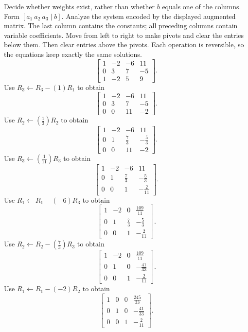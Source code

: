 \goal Decide whether weights exist, rather than whether $b$ equals one of the columns. Form $[a_1\ a_2\ a_3\mid b]$.
\goal Analyze the system encoded by the displayed augmented matrix. The last column contains the constants; all preceding columns contain variable coefficients.
\idea Move from left to right to make pivots and clear the entries below them. Then clear entries above the pivots. Each operation is reversible, so the equations keep exactly the same solutions.
\[ \left[\begin{array}{rrr|r}1&-2&-6&11\\0&3&7&-5\\1&-2&5&9\end{array}\right].\]
Use $R_{3}\leftarrow R_{3}-(1)R_{1}$ to obtain
\[ \left[\begin{array}{rrr|r}1&-2&-6&11\\0&3&7&-5\\0&0&11&-2\end{array}\right].\]
Use $R_{2}\leftarrow(\frac{1}{3})R_{2}$ to obtain
\[ \left[\begin{array}{rrr|r}1&-2&-6&11\\0&1&\frac{7}{3}&- \frac{5}{3}\\0&0&11&-2\end{array}\right].\]
Use $R_{3}\leftarrow(\frac{1}{11})R_{3}$ to obtain
\[ \left[\begin{array}{rrr|r}1&-2&-6&11\\0&1&\frac{7}{3}&- \frac{5}{3}\\0&0&1&- \frac{2}{11}\end{array}\right].\]
Use $R_{1}\leftarrow R_{1}-(-6)R_{3}$ to obtain
\[ \left[\begin{array}{rrr|r}1&-2&0&\frac{109}{11}\\0&1&\frac{7}{3}&- \frac{5}{3}\\0&0&1&- \frac{2}{11}\end{array}\right].\]
Use $R_{2}\leftarrow R_{2}-(\frac{7}{3})R_{3}$ to obtain
\[ \left[\begin{array}{rrr|r}1&-2&0&\frac{109}{11}\\0&1&0&- \frac{41}{33}\\0&0&1&- \frac{2}{11}\end{array}\right].\]
Use $R_{1}\leftarrow R_{1}-(-2)R_{2}$ to obtain
\[ \left[\begin{array}{rrr|r}1&0&0&\frac{245}{33}\\0&1&0&- \frac{41}{33}\\0&0&1&- \frac{2}{11}\end{array}\right].\]
